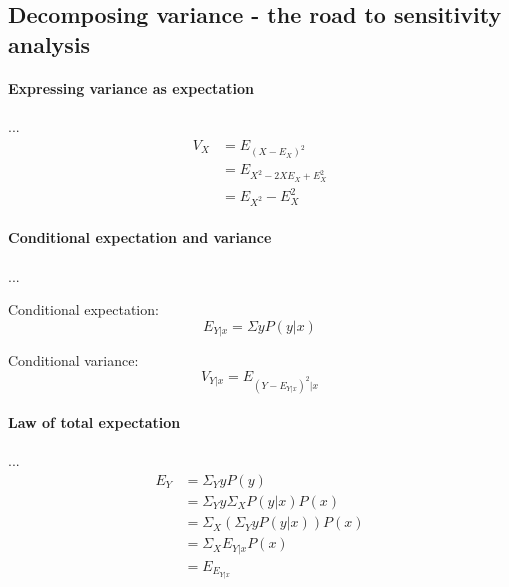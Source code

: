 \subsection{Decomposing variance - the road to sensitivity analysis}

\paragraph{Expressing variance as expectation} ...
\begin{equation}
    \begin{aligned}
        V_X &= E_{ (X - E_X)^2 } \\
            &= E_{ X^2 - 2 X E_X + E_X^2 } \\
            &= E_{X^2} - E_X^2
    \end{aligned}
\end{equation}

\paragraph{Conditional expectation and variance} ...

\begin{definition} \label{conditionalExpectation}
    Conditional expectation:
    $$ E_{Y|x} = \Sigma y P(y|x) $$
\end{definition}

\begin{definition} \label{conditionalVariance}
    Conditional variance: 
    $$ V_{Y|x} = E_{(Y - E_{Y|x})^2 | x} $$ 
\end{definition}

\paragraph{Law of total expectation} ...
\begin{equation} \label{lawOfTotalExpectation}
    \begin{aligned}
        E_Y &= \Sigma_Y y P(y) \\
            &= \Sigma_Y y \Sigma_X P(y|x) P(x) \\
            &= \Sigma_X (\Sigma_Y y P(y|x)) P(x) \\
            &= \Sigma_X E_{Y|x} P(x) \\
            &= E_{E_{Y|x}}
    \end{aligned}
\end{equation}

